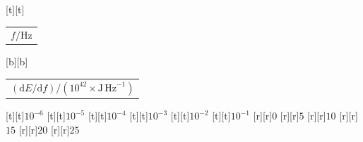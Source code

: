 %    
%
%
\begin{psfrags}%
\psfragscanon%
%
[t][t]{\color[rgb]{0,0,0}\setlength{\tabcolsep}{0pt}\begin{tabular}{c}{\Large$f/\mathrm{Hz}$}\end{tabular}}%
[b][b]{\color[rgb]{0,0,0}\setlength{\tabcolsep}{0pt}\begin{tabular}{c}{\Large$(\mathrm{d}E/\mathrm{d}{f})/\left(10^{42} \times \mathrm{J\,Hz}^{-1}\right)$}\end{tabular}}%
%
[t][t]{$10^{-6}$}%
[t][t]{$10^{-5}$}%
[t][t]{$10^{-4}$}%
[t][t]{$10^{-3}$}%
[t][t]{$10^{-2}$}%
[t][t]{$10^{-1}$}%
%
[r][r]{$0$}%
[r][r]{$5$}%
[r][r]{$10$}%
[r][r]{$15$}%
[r][r]{$20$}%
[r][r]{$25$}%
%
%
\end{psfrags}%
%

